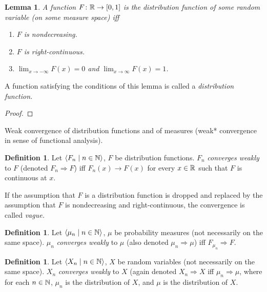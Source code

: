\documentclass{amsart}
\newtheorem{lemma}[theorem]{Lemma}
\theoremstyle{definition}
\newtheorem{definition}[theorem]{Definition}
\theoremstyle{remark}
\newcommand{\bldseq}[2]{\langle{#1}\mid{#2}\rangle}
\begin{document}
\begin{lemma}
A function $F\colon \mathbb{R} \rightarrow [0,1]$ is the distribution function of some random variable (on some measure space) iff
\begin{enumerate}
\item $F$ is nondecreasing.
\item $F$ is right-continuous.
\item $\lim_{x \rightarrow -\infty} F(x) = 0$ and $\lim_{x \rightarrow \infty} F(x) = 1$.
\end{enumerate}
\end{lemma}

A function satisfying the conditions of this lemma is called a {\em distribution function.}

\begin{proof}
\end{proof}

Weak convergence of distribution functions and of measures (weak* convergence in sense of functional analysis).

\begin{definition}
Let $\bldseq{F_n}{n \in \N}$, $F$ be distribution functions. $F_n$ {\em converges weakly} to $F$ (denoted $F_n \Rightarrow F$) iff $F_n(x) \rightarrow F(x)$ for every $x \in \mathbb{R}$ such that $F$ is continuous at $x$.
\end{definition}

If the assumption that $F$ is a distribution function is dropped and replaced by the assumption that $F$ is nondecreasing and right-continuous, the convergence is called {\em vague.}

\begin{definition}
Let $\bldseq{\mu_n}{n \in \N}$, $\mu$ be probability measures (not necessarily on the same space). $\mu_n$ {\em converges weakly} to $\mu$ (also denoted $\mu_n \Rightarrow \mu$) iff $F_{\mu_n} \Rightarrow F$.
\end{definition}

\begin{definition}
Let $\bldseq{X_n}{n \in \N}$, $X$ be random variables (not necessarily on the same space). $X_n$ {\em converges weakly} to $X$ (again denoted $X_n \Rightarrow X$ iff $\mu_n \Rightarrow \mu$, where for each $n \in \mathbb{N}$, $\mu_n$ is the distribution of $X$, and $\mu$ is the distribution of $X$.
\end{definition}

\end{document}
